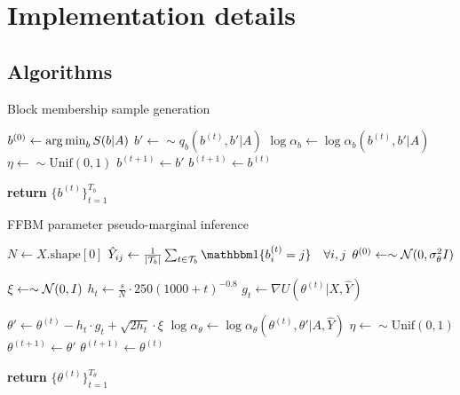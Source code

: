 \section{Implementation details}

\subsection{Algorithms}
\label{appdx:algorithms}

\begin{algorithm} %
	\caption{Block membership sample generation} %
	\label{alg:b-samples} %
	\begin{algorithmic} %
		\State $b^{(0)} \gets \operatorname*{arg\,min}_b S(b|A)$ 
		\State $b' \gets \sim q_b(b^{(t)}, b' | A)$
		\State $\log \alpha_b \gets \log \alpha_b(b^{(t)}, b' | A)$
		\State $\eta \gets \sim \textrm{Unif}(0,1)$
		\State $b^{(t+1)} \gets b'$
		\Else
		\State $b^{(t+1)} \gets b^{(t)}$
		\EndIf
		\EndFor
		
		\State \textbf{return} $\{b^{(t)}\}_{t=1}^{T_b}$
		\EndProcedure
	\end{algorithmic}
\end{algorithm}

\begin{algorithm} %
	\caption{FFBM parameter pseudo-marginal inference} %
	\label{alg:theta-samples} %
	\begin{algorithmic} %
		
		\State $N \gets X.\textrm{shape}[0]$
		\State $\hat{Y}_{ij} \gets \frac{1}{|\Tcal_b|} \sum_{t \in \Tcal_b} \one \{ b^{(t)}_i = j\} \quad \forall i,j$
		\State $\theta^{(0)} \gets \sim \mathcal{N}(0, \sigma_\theta^2 I)$
		
		\item[]
		
		\State $\xi \gets \sim \mathcal{N}(0, I)$
		\State $h_t \gets \frac{s}{N} \cdot 250(1000 + t)^{-0.8}$
		\State $g_t \gets \nabla U(\theta^{(t)}| X, \hat{Y})$
		\item[]
		\State $\theta' \gets \theta^{(t)} - h_t \cdot g_t + \sqrt{2h_t} \cdot \xi$
		\State $\log \alpha_\theta \gets \log \alpha_\theta(\theta^{(t)}, \theta' | A, \hat{Y})$
		\State $\eta \gets \sim \textrm{Unif}(0,1)$
		\If{$\log \eta < \log \alpha_\theta$}
		\State $\theta^{(t+1)} \gets \theta'$
		\Else
		\State $\theta^{(t+1)} \gets \theta^{(t)}$
		\EndIf
		\EndFor
		
		\State \textbf{return} $\{\theta^{(t)}\}_{t=1}^{T_\theta}$
		\EndProcedure
	\end{algorithmic}
\end{algorithm}

